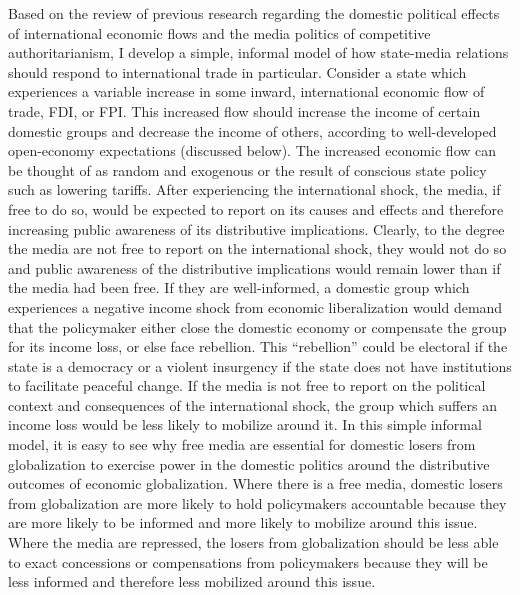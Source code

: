 \documentclass[12pt,a4paper]{article}\usepackage[]{graphicx}\usepackage[]{color}
\begin{document}
Based on the review of previous research regarding the domestic political effects of international economic flows and the media politics of competitive authoritarianism, I develop a simple, informal model of how state-media relations should respond to international trade in particular. Consider a state which experiences a variable increase in some inward, international economic flow of trade, FDI, or FPI. This increased flow should increase the income of certain domestic groups and decrease the income of others, according to well-developed open-economy expectations (discussed below). The increased economic flow can be thought of as random and exogenous or the result of conscious state policy such as lowering tariffs. After experiencing the international shock, the media, if free to do so, would be expected to report on its causes and effects and therefore increasing public awareness of its distributive implications. Clearly, to the degree the media are not free to report on the international shock, they would not do so and public awareness of the distributive implications would remain lower than if the media had been free. If they are well-informed, a domestic group which experiences a negative income shock from economic liberalization would demand that the policymaker either close the domestic economy or compensate the group for its income loss, or else face rebellion. This “rebellion” could be electoral if the state is a democracy or a violent insurgency if the state does not have institutions to facilitate peaceful change. If the media is not free to report on the political context and consequences of the international shock, the group which suffers an income loss would be less likely to mobilize around it. In this simple informal model, it is easy to see why free media are essential for domestic losers from globalization to exercise power in the domestic politics around the distributive outcomes of economic globalization. Where there is a free media, domestic losers from globalization are more likely to hold policymakers accountable because they are more likely to be informed and more likely to mobilize around this issue. Where the media are repressed, the losers from globalization should be less able to exact concessions or compensations from policymakers because they will be less informed and therefore less mobilized around this issue.
\end{document}
